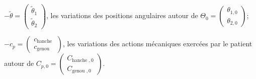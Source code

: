\documentclass[10pt]{article}
\begin{document}
$-\tilde{\theta}=\left(\begin{array}{c}\tilde{\theta}_{1} \\ \tilde{\theta}_{2}\end{array}\right)$, les variations des positions angulaires autour de $\Theta_{0}=\left(\begin{array}{c}\theta_{1,0} \\ \theta_{2,0}\end{array}\right)$;

$-c_{p}=\left(\begin{array}{c}c_{\text {hanche }} \\ c_{\text {genou }}\end{array}\right)$, les variations des actions mécaniques exercées par le patient autour de $C_{p, 0}=\left(\begin{array}{c}C_{\text {hanche }, 0} \\ C_{\text {genou }, 0}\end{array}\right)$.
\end{document}
